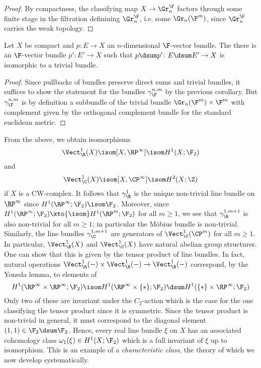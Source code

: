 \begin{proof}
	By compactness, the classifying map $X \to \Gr^{\F}_n$ factors through some finite stage in the filtration definining $\Gr^{\F}_n$, i.e. some $\Gr_n(\F^m)$, since $\Gr^{\F}_n$ carries the weak topology.
\end{proof}
\begin{corollary}\label{prop:swanslemma}
	Let $X$ be compact and $p\colon E \to X$ an $n$-dimensional $\F$-vector bundle.
	The there is an $\F$-vector bundle $p'\colon E' \to X$ such that $p \dsum p'\colon E \dsum E' \to X$ is isomorphic to a trivial bundle.
\end{corollary}
\begin{proof}
	Since pullbacks of bundles preserve direct sums and trivial bundles, it suffices to show the statement for the bundles $\gamma_{\F}^{n , m}$ by the previous corollary.
	But $\gamma_{\F}^{n, m}$ is by definition a subbundle of the trivial bundle $\Gr_n(\F^m) \times \F^m$ with complement given by the orthogonal complement bundle for the standard euclidean metric.
\end{proof}
\begin{example}
	From the above, we obtain isomorphisms
	\begin{equation*}
		\Vect_{\R}^1(X) \isom [X, \RP^\infty] \isom H^1(X; \F_2)
	\end{equation*}
	and
	\begin{equation*}
		\Vect_{\C}^1(X) \isom [X, \CP^\infty] \isom H^2(X; \Z)
	\end{equation*}
	if $X$ is a CW-complex.
	It follows that $\gamma_{\R}^1$ is the unique non-trivial line bundle on $\RP^\infty$ since $H^1(\RP^\infty; \F_2) \isom \F_2$.
	Moreover, since $H^1(\RP^\infty; \F_2) \xto{\isom} H^1(\RP^m; \F_2)$ for all $m \geq 1$, we see that $\gamma_{\R}^{1, m + 1}$ is also non-trivial for all $m \geq 1$; in particular the Möbius bundle is non-trivial.
	Similarly, the line bundles $\gamma_{\C}^{1, m + 1}$ are generators of $\Vect_{\C}^1(\CP^m)$ for all $m \geq 1$.
	In particular, $\Vect_{\R}^1(X)$ and $\Vect_{\C}^1(X)$ have natural abelian group structures.
	One can show that this is given by the tensor product of line bundles.
	In fact, natural operations $\Vect_{\R}^1({{-}}) \times \Vect_{\R}^1({{-}}) \to \Vect_{\R}^1({{-}})$ correspond, by the Yoneda lemma, to elements of
	\begin{equation*}
		H^1(\RP^\infty \times \RP^\infty; \F_2) \isom H^1(\RP^\infty \times \{*\}; \F_2) \dsum H^1(\{*\} \times \RP^\infty; \F_2)
	\end{equation*}
	Only two of these are invariant under the $C_2$-action which is the case for the one classifying the tensor product since it is symmetric.
	Since the tensor product is non-trivial in general, it must correspond to the diagonal element $(1, 1) \in \F_2 \dsum \F_2$.
	Hence, every real line bundle $\xi$ on $X$ has an associated cohomology class $\omega_1(\xi) \in H^1(X; \F_2)$ which is a full invariant of $\xi$ up to isomorphism.
	This is an example of a \emph{characteristic class}, the theory of which we now develop systematically.
\end{example}

